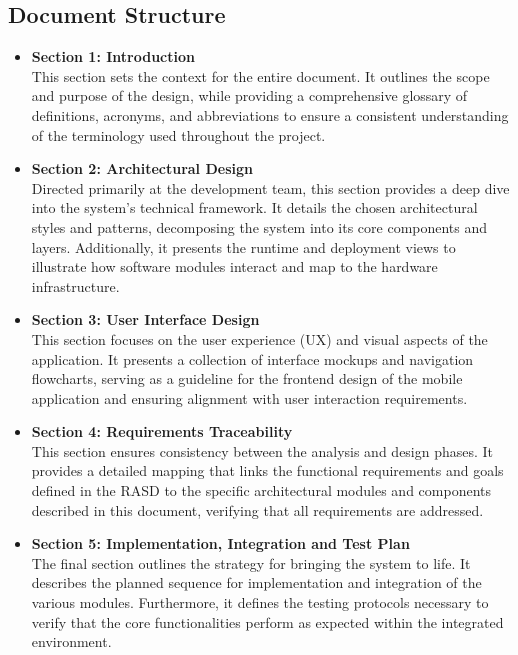 \subsection{Document Structure}
\begin{itemize}
    \item \textbf{Section 1: Introduction}\\
    This section sets the context for the entire document. It outlines the scope and purpose of the design, while providing a comprehensive glossary of definitions, acronyms, and abbreviations to ensure a consistent understanding of the terminology used throughout the project.

    \item \textbf{Section 2: Architectural Design}\\
    Directed primarily at the development team, this section provides a deep dive into the system's technical framework. It details the chosen architectural styles and patterns, decomposing the system into its core components and layers. Additionally, it presents the runtime and deployment views to illustrate how software modules interact and map to the hardware infrastructure.

    \item \textbf{Section 3: User Interface Design}\\
    This section focuses on the user experience (UX) and visual aspects of the application. It presents a collection of interface mockups and navigation flowcharts, serving as a guideline for the frontend design of the mobile application and ensuring alignment with user interaction requirements.

    \item \textbf{Section 4: Requirements Traceability}\\
    This section ensures consistency between the analysis and design phases. It provides a detailed mapping that links the functional requirements and goals defined in the RASD to the specific architectural modules and components described in this document, verifying that all requirements are addressed.

    \item \textbf{Section 5: Implementation, Integration and Test Plan}\\
    The final section outlines the strategy for bringing the system to life. It describes the planned sequence for implementation and integration of the various modules. Furthermore, it defines the testing protocols necessary to verify that the core functionalities perform as expected within the integrated environment.
\end{itemize}